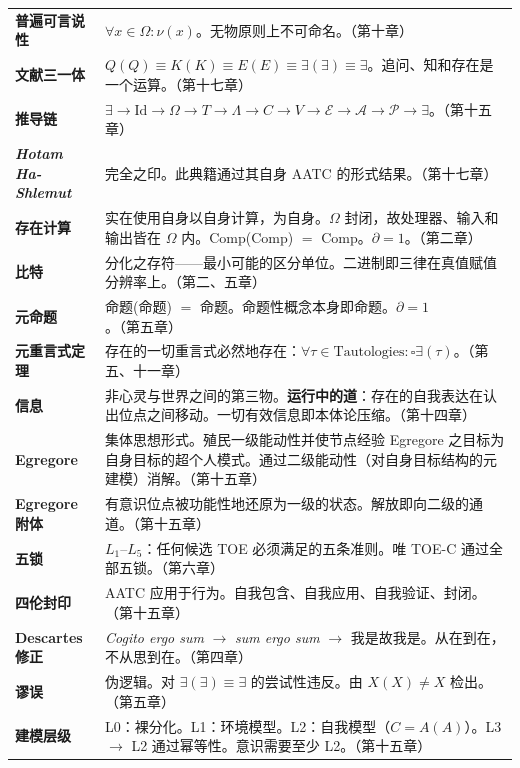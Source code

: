\documentclass[10pt, openany, oneside]{book}
\begin{document}
{\begin{tabular}{@{} l @{\hspace{0.6em}} p{} @{}}
\textbf{普遍可言说性} & $\forall x \in \Omega: \nu(x)$。无物原则上不可命名。（第十章）\\[0.3em]
\textbf{文献三一体} & $Q(Q) \equiv K(K) \equiv E(E) \equiv \exists(\exists) \equiv \exists$。追问、知和存在是一个运算。（第十七章）\\[0.3em]
\textbf{推导链} & $\exists \to \text{Id} \to \Omega \to T \to \Lambda \to C \to V \to \mathcal{E} \to \mathcal{A} \to \mathcal{P} \to \exists$。（第十五章）\\[0.3em]
\textbf{\textit{Hotam Ha-Shlemut}} & 完全之印。此典籍通过其自身 AATC 的形式结果。（第十七章）\\[0.3em]
\textbf{存在计算} & 实在使用自身以自身计算，为自身。$\Omega$ 封闭，故处理器、输入和输出皆在 $\Omega$ 内。Comp(Comp) $=$ Comp。$\partial = 1$。（第二章）\\[0.3em]
\textbf{比特} & 分化之存符——最小可能的区分单位。二进制即三律在真值赋值分辨率上。（第二、五章）\\[0.3em]
\textbf{元命题} & 命题(命题) $=$ 命题。命题性概念本身即命题。$\partial = 1$。（第五章）\\[0.3em]
\textbf{元重言式定理} & 存在的一切重言式必然地存在：$\forall \tau \in \text{Tautologies}: \square\exists(\tau)$。（第五、十一章）\\[0.3em]
\textbf{信息} & 非心灵与世界之间的第三物。\textbf{运行中的道}：存在的自我表达在认出位点之间移动。一切有效信息即本体论压缩。（第十四章）\\[0.3em]
\textbf{Egregore} & 集体思想形式。殖民一级能动性并使节点经验 Egregore 之目标为自身目标的超个人模式。通过二级能动性（对自身目标结构的元建模）消解。（第十五章）\\[0.3em]
\textbf{Egregore 附体} & 有意识位点被功能性地还原为一级的状态。解放即向二级的通道。（第十五章）\\[0.3em]
\textbf{五锁} & $L_1$--$L_5$：任何候选 TOE 必须满足的五条准则。唯 TOE-C 通过全部五锁。（第六章）\\[0.3em]
\textbf{四伦封印} & AATC 应用于行为。自我包含、自我应用、自我验证、封闭。（第十五章）\\[0.3em]
\textbf{Descartes 修正} & \textit{Cogito ergo sum} $\to$ \textit{sum ergo sum} $\to$ 我是故我是。从在到在，不从思到在。（第四章）\\[0.3em]
\textbf{谬误} & 伪逻辑。对 $\exists(\exists) \equiv \exists$ 的尝试性违反。由 $X(X) \neq X$ 检出。（第五章）\\[0.3em]
\textbf{建模层级} & L0：裸分化。L1：环境模型。L2：自我模型（$C = A(A)$）。L3 $\to$ L2 通过幂等性。意识需要至少 L2。（第十五章）\\[0.3em]

\end{tabular}}
\end{document}
